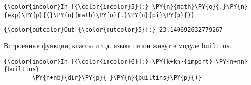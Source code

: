     \begin{Verbatim}[commandchars=\\\{\}]
{\color{incolor}In [{\color{incolor}5}]:} \PY{n}{math}\PY{o}{.}\PY{n}{exp}\PY{p}{(}\PY{n}{math}\PY{o}{.}\PY{n}{pi}\PY{p}{)}
\end{Verbatim}

            \begin{Verbatim}[commandchars=\\\{\}]
{\color{outcolor}Out[{\color{outcolor}5}]:} 23.140692632779267
\end{Verbatim}
        
    Встроенные функции, классы и т.д. языка питон живут в модуле
\texttt{builtins}.

    \begin{Verbatim}[commandchars=\\\{\}]
{\color{incolor}In [{\color{incolor}6}]:} \PY{k+kn}{import} \PY{n+nn}{builtins}
        \PY{n+nb}{dir}\PY{p}{(}\PY{n}{builtins}\PY{p}{)}
\end{Verbatim}

